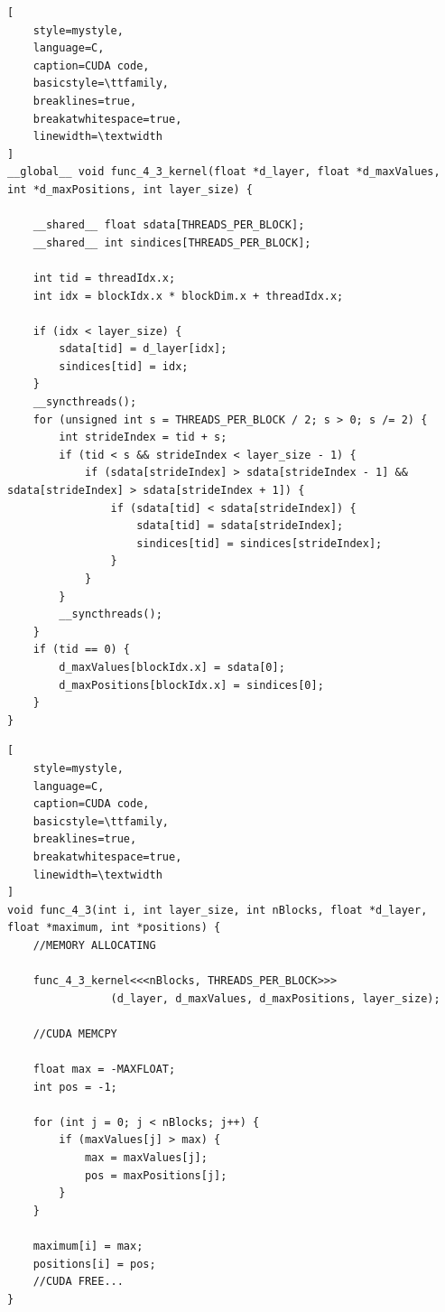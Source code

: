 \documentclass[10pt,journal,compsoc]{IEEEtran}
\begin{document}
\begin{minipage}{\linewidth}
\begin{lstlisting}[
    style=mystyle,
    language=C,
    caption=CUDA code,
    basicstyle=\ttfamily,
    breaklines=true,
    breakatwhitespace=true,
    linewidth=\textwidth
]
__global__ void func_4_3_kernel(float *d_layer, float *d_maxValues, int *d_maxPositions, int layer_size) {
    
    __shared__ float sdata[THREADS_PER_BLOCK];
    __shared__ int sindices[THREADS_PER_BLOCK];

    int tid = threadIdx.x;
    int idx = blockIdx.x * blockDim.x + threadIdx.x;

    if (idx < layer_size) {
        sdata[tid] = d_layer[idx];
        sindices[tid] = idx;
    }
    __syncthreads();
    for (unsigned int s = THREADS_PER_BLOCK / 2; s > 0; s /= 2) {
        int strideIndex = tid + s;
        if (tid < s && strideIndex < layer_size - 1) {
            if (sdata[strideIndex] > sdata[strideIndex - 1] && sdata[strideIndex] > sdata[strideIndex + 1]) {
                if (sdata[tid] < sdata[strideIndex]) {
                    sdata[tid] = sdata[strideIndex];
                    sindices[tid] = sindices[strideIndex];
                }
            }
        }
        __syncthreads();
    }
    if (tid == 0) {
        d_maxValues[blockIdx.x] = sdata[0];
        d_maxPositions[blockIdx.x] = sindices[0];
    }
}
\end{lstlisting}
\end{minipage}

\begin{minipage}{\linewidth}
\begin{lstlisting}[
    style=mystyle,
    language=C,
    caption=CUDA code,
    basicstyle=\ttfamily,
    breaklines=true,
    breakatwhitespace=true,
    linewidth=\textwidth
]
void func_4_3(int i, int layer_size, int nBlocks, float *d_layer, float *maximum, int *positions) {
    //MEMORY ALLOCATING

    func_4_3_kernel<<<nBlocks, THREADS_PER_BLOCK>>>
                (d_layer, d_maxValues, d_maxPositions, layer_size);
    
    //CUDA MEMCPY

    float max = -MAXFLOAT;
    int pos = -1;

    for (int j = 0; j < nBlocks; j++) {
        if (maxValues[j] > max) {
            max = maxValues[j];
            pos = maxPositions[j];
        }
    }

    maximum[i] = max;
    positions[i] = pos;
    //CUDA FREE...
}
\end{lstlisting}
\end{minipage}
\end{document}
